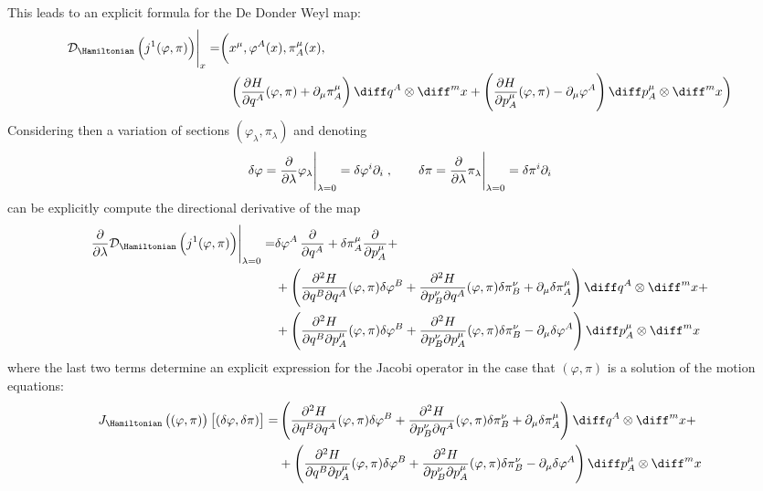 \documentclass[a4paper,12pt,fleqn]{scrartcl}  %
\begin{document}
%
This leads to an explicit formula for the De Donder Weyl map:
\begin{align*}
	\eval{\mathcal{D}_\Hamiltonian \left( j^1 (\varphi, \pi) \right) }_{x} = \biggr( & 
		x^\mu, \varphi^A(x), \pi^\mu_A(x), \\
		& \left( \frac{\partial H}{\partial q^A} (\varphi,\pi) + \partial_\mu \pi^\mu_A \right)	\diff q^A \otimes \diff^m x 
			+ \left( \frac{\partial H}{\partial p^\mu_A} (\varphi,\pi) - \partial_\mu \varphi^A \right)	\diff p^\mu_A \otimes \diff^m x
		\biggr)
\end{align*}
%
Considering then a variation of sections $(\varphi_\lambda, \pi_\lambda)$ and denoting
\begin{displaymath}
	\delta \varphi = 
	\eval{ \dfrac{\partial}{\partial \lambda} \varphi_\lambda }_{ \lambda=0} =
	\delta \varphi^i \partial_i	\\
	\; , \qquad
	\delta \pi = 
	\eval{ \dfrac{\partial}{\partial \lambda} \pi_\lambda }_{ \lambda=0} =
	\delta \pi^i \partial_i
\end{displaymath}
can be explicitly compute the directional derivative of the map
\begin{align*}
	\eval{ \dfrac{\partial}{\partial \lambda} \mathcal{D}_\Hamiltonian \left( j^1 (\varphi, \pi) \right)}_{ \lambda=0} = &
	\delta \varphi^A \, \dfrac{\partial}{\partial q^A} + 
	\delta \pi^\mu_A \dfrac{\partial}{\partial p^\mu_A} + \\
	& + \left( 
		\frac{\partial^2 H}{\partial q^B \partial q^A} (\varphi, \pi) \delta \varphi^B +
		\frac{\partial^2 H}{\partial p^\nu_B \partial q^A} (\varphi, \pi) \delta \pi^\nu_B +
		\partial_\mu \delta \pi^\mu_A
	\right)\diff q^A  \otimes \diff^m x + \\
	& + \left( 
		\frac{\partial^2 H}{\partial q^B \partial p^\mu_A} (\varphi, \pi) \delta \varphi^B +
		\frac{\partial^2 H}{\partial p^\nu_B \partial p^\mu_A}(\varphi, \pi) \delta \pi^\nu_B -
		\partial_\mu \delta \varphi^A
	\right)\diff p^\mu_A  \otimes \diff^m x
\end{align*}
where the last two terms determine an explicit expression for the Jacobi operator in the case that $(\varphi,\pi)$ is a solution of the motion equations:
\begin{align*}
	J_\Hamiltonian\left( (\varphi, \pi)\right) \left[ (\delta\varphi , \delta \pi ) \right] =
	& \left( 
		\frac{\partial^2 H}{\partial q^B \partial q^A} (\varphi, \pi) \delta \varphi^B +
		\frac{\partial^2 H}{\partial p^\nu_B \partial q^A} (\varphi, \pi) \delta \pi^\nu_B +
		\partial_\mu \delta \pi^\mu_A
	\right)\diff q^A  \otimes \diff^m x + \\
	& + \left( 
		\frac{\partial^2 H}{\partial q^B \partial p^\mu_A} (\varphi, \pi) \delta \varphi^B +
		\frac{\partial^2 H}{\partial p^\nu_B \partial p^\mu_A}(\varphi, \pi) \delta \pi^\nu_B -
		\partial_\mu \delta \varphi^A
	\right)\diff p^\mu_A  \otimes \diff^m x
\end{align*}
\end{document}
